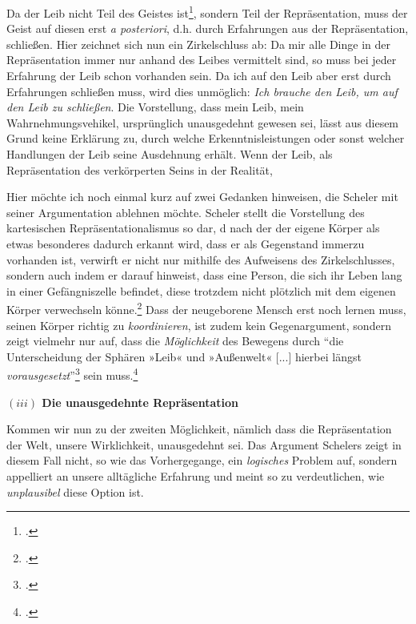 \documentclass[a4paper, 12pt]{article}
\begin{document}
\begin{onehalfspace}

Da der Leib nicht Teil des Geistes ist\footnote{\Cite[Vgl.][S. 499]{scheler-ethik}.}, sondern Teil der Repräsentation, muss der Geist auf diesen erst \emph{a posteriori}, d.h. durch Erfahrungen aus der Repräsentation, schließen. Hier zeichnet sich nun ein Zirkelschluss ab: Da mir alle Dinge in der Repräsentation immer nur anhand des Leibes vermittelt sind, so muss bei jeder Erfahrung der Leib schon vorhanden sein. Da ich auf den Leib aber erst durch Erfahrungen schließen muss, wird dies unmöglich: \emph{Ich brauche den Leib, um auf den Leib zu schließen}. Die Vorstellung, dass mein Leib, mein Wahrnehmungsvehikel, ursprünglich unausgedehnt gewesen sei, lässt aus diesem Grund keine Erklärung zu, durch welche Erkenntnisleistungen oder sonst welcher Handlungen der Leib seine Ausdehnung erhält. Wenn der Leib, als Repräsentation des verkörperten Seins in der Realität, 

Hier möchte ich noch einmal kurz auf zwei Gedanken hinweisen, die Scheler mit seiner Argumentation ablehnen möchte. Scheler stellt die Vorstellung des kartesischen Repräsentationalismus so dar, d nach der der eigene Körper als etwas besonderes dadurch erkannt wird, dass er als Gegenstand immerzu vorhanden ist, verwirft er nicht nur mithilfe des Aufweisens des Zirkelschlusses, sondern auch indem er darauf hinweist, dass eine Person, die sich ihr Leben lang in einer Gefängniszelle befindet, diese trotzdem nicht plötzlich mit dem eigenen Körper verwechseln könne.\footnote{\Cite[Vgl.][S. 494]{scheler-ethik}.} Dass der neugeborene Mensch erst noch lernen muss, seinen Körper richtig zu \emph{koordinieren}, ist zudem kein Gegenargument, sondern zeigt vielmehr nur auf, dass die \emph{Möglichkeit} des Bewegens durch "`die Unterscheidung der Sphären »Leib« und »Außenwelt« [...] hierbei längst \emph{vorausgesetzt}"'\footnote{\Cite[Siehe][S. 496]{scheler-ethik}.} sein muss.\footnote{\Cite[Vgl. zudem auch][S. 492]{scheler-ethik}.} 


\vspace{5mm}
\noindent\textbf{$(iii)$ Die unausgedehnte Repräsentation}


\noindent Kommen wir nun zu der zweiten Möglichkeit, nämlich dass die Repräsentation der Welt, unsere Wirklichkeit, unausgedehnt sei. Das Argument Schelers zeigt in diesem Fall nicht, so wie das Vorhergegange, ein \emph{logisches} Problem auf, sondern appelliert an unsere alltägliche Erfahrung und 	meint so zu verdeutlichen, wie \emph{unplausibel} diese Option ist.


\end{onehalfspace}
\end{document}
